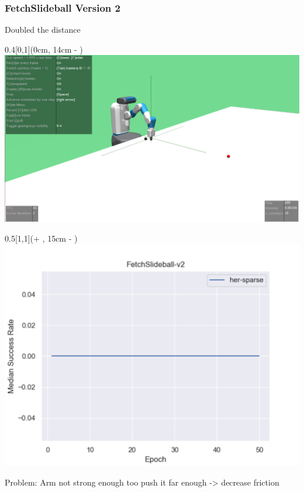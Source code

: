 




\begin{frame}
	\frametitle{FetchSlideball Version 2}	
	\vspace{1cm}
	
	Doubled the distance
	
	
    \begin{textblock*}{0.4\paperwidth}[0,1](0cm, 14cm - \PraesentationSeitenrand)%
        \includegraphics[width=0.4\paperwidth]{./Ressourcen/Figures/FetchSlideball-v2.pdf}
    \end{textblock*}
    
    
    \begin{textblock*}{0.5\paperwidth}[1,1](\textwidth + \PraesentationSeitenrand, 15cm - \PraesentationSeitenrand)%
    	\includegraphics[width=0.5\paperwidth]{./Ressourcen/Figures/fig_FetchSlideball-v2.pdf}
    \end{textblock*}
	
	
	Problem: Arm not strong enough too push it far enough -> decrease friction
	
\end{frame}
\clearpage


